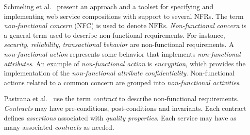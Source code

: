 \documentclass[english,12pt]{article}
\begin{document}
 
Schmeling et al.~\cite{SchmelingCM11} present an approach and a toolset for specifying and implementing web service compositions with support to several NFRs. The term \textit{non-functional concern} (NFC) is used to denote  NFRs. 
\textit{Non-functional concern} is a general term used to describe non-functional requirements. 
For instance, \textit{security}, \textit{reliability}, \textit{transactional behavior} are non-functional requirements. 
A \textit{non-functional action} represents some behavior that implements \textit{non-functional attributes}. 
An example of \textit{non-functional action} is \textit{encryption}, which provides the implementation of the \textit{non-functional attribute} \textit{confidentiality}. 
Non-functional actions related to a common concern are grouped into \textit{non-functional activities}. 

Pastrana et al.~\cite{PastranaPK11} use the term \textit{contract} to describe non-functional requirements. 
\textit{Contracts} may have pre-conditions, post-conditions and invariants. 
Each contract defines \textit{assertions} associated with \textit{quality properties}. 
Each service may have as many associated \textit{contracts} as needed.

 
\end{document}
